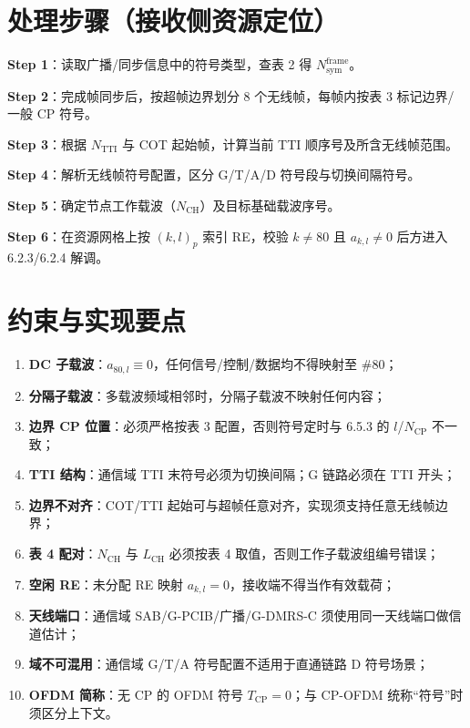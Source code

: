 \documentclass[11pt,a4paper]{ctexart}
\begin{document}
\section{处理步骤（接收侧资源定位）}

\textbf{Step 1}：读取广播/同步信息中的符号类型，查表 2 得 $N_{\mathrm{sym}}^{\mathrm{frame}}$。

\textbf{Step 2}：完成帧同步后，按超帧边界划分 8 个无线帧，每帧内按表 3 标记边界/一般 CP 符号。

\textbf{Step 3}：根据 $N_{\mathrm{TTI}}$ 与 COT 起始帧，计算当前 TTI 顺序号及所含无线帧范围。

\textbf{Step 4}：解析无线帧符号配置，区分 G/T/A/D 符号段与切换间隔符号。

\textbf{Step 5}：确定节点工作载波（$N_{\mathrm{CH}}$）及目标基础载波序号。

\textbf{Step 6}：在资源网格上按 $(k,l)_p$ 索引 RE，校验 $k{\neq}80$ 且 $a_{k,l}{\neq}0$ 后方进入 6.2.3/6.2.4 解调。

\section{约束与实现要点}

\begin{enumerate}[nosep]
  \item \textbf{DC 子载波}：$a_{80,l}\equiv 0$，任何信号/控制/数据均不得映射至 \#80；
  \item \textbf{分隔子载波}：多载波频域相邻时，分隔子载波不映射任何内容；
  \item \textbf{边界 CP 位置}：必须严格按表 3 配置，否则符号定时与 6.5.3 的 $l$/$N_{\mathrm{CP}}$ 不一致；
  \item \textbf{TTI 结构}：通信域 TTI 末符号必须为切换间隔；G 链路必须在 TTI 开头；
  \item \textbf{边界不对齐}：COT/TTI 起始可与超帧任意对齐，实现须支持任意无线帧边界；
  \item \textbf{表 4 配对}：$N_{\mathrm{CH}}$ 与 $L_{\mathrm{CH}}$ 必须按表 4 取值，否则工作子载波组编号错误；
  \item \textbf{空闲 RE}：未分配 RE 映射 $a_{k,l}{=}0$，接收端不得当作有效载荷；
  \item \textbf{天线端口}：通信域 SAB/G-PCIB/广播/G-DMRS-C 须使用同一天线端口做信道估计；
  \item \textbf{域不可混用}：通信域 G/T/A 符号配置不适用于直通链路 D 符号场景；
  \item \textbf{OFDM 简称}：无 CP 的 OFDM 符号 $T_{\mathrm{CP}}{=}0$；与 CP-OFDM 统称``符号''时须区分上下文。
\end{enumerate}
\end{document}
